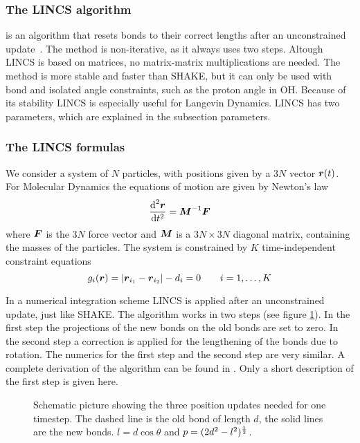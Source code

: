 \newcommand{\fs}{\begin{equation} \label}
\newcommand{\fe}{\end{equation}}
\newcommand{\p}{\partial}
\newcommand{\Bm}{\ve{B}}
\newcommand{\M}{\ve{M}}
\newcommand{\iM}{\M^{-1}}
\newcommand{\Tm}{\ve{T}}
\newcommand{\Sm}{\ve{S}}
\newcommand{\fo}{\ve{f}}
\newcommand{\con}{\ve{g}}
\newcommand{\lenc}{\ve{d}}

\subsubsection*{The LINCS algorithm}
 is an algorithm that resets bonds to their correct lengths
after an unconstrained update~\cite{Hess97}. 
The method is non-iterative, as it always uses two steps.
Altough LINCS is based on matrices, no matrix-matrix multiplications are 
needed. The method is more stable and faster than SHAKE, 
but it can only be used with bond  and 
isolated angle constraints, such as the proton angle in OH. 
Because of its stability LINCS is especially useful for Langevin Dynamics. 
LINCS has two parameters, which are explained in the subsection parameters.
 
\subsubsection*{The LINCS formulas}
We consider a system of $N$ particles, with positions given by a
$3N$ vector $\mbox{\boldmath ${r}$}(t)$.
For Molecular Dynamics the equations of motion are given by Newton's law
\fs{c1}
{\de^2 \ve{r} \over \de t^2} = \iM \ve{F}
\fe
where $\mbox{\boldmath ${F}$}$ is the $3N$ force vector 
and $\M$ is a $3N \times 3N$ diagonal matrix,
containing the masses of the particles.
The system is constrained by $K$ time-independent constraint equations
\fs{c2}
g_i(\ve{r}) = | \ve{r}_{i_1}-\ve{r}_{i_2} | - d_i = 0 ~~~~~~i=1,\ldots,K
\fe

In a numerical integration scheme LINCS is applied after an 
unconstrained update, just like SHAKE.
The algorithm works in two steps (see figure \ref{lincs_fig}).
In the first step the projections of the new bonds on the old
bonds are set to zero. In the second step a correction is 
applied for the lengthening of the bonds due to rotation.
The numerics for the first step and the second step are very similar. 
A complete derivation of the algorithm can be found in \cite{Hess97}.
Only a short description of the first step is given here.
\begin{figure}
\centerline{}
\caption{
\label{lincs_fig}Schematic picture showing the three position updates needed 
for one timestep. 
The dashed line is the old bond of length $d$, 
the solid lines are the new bonds.
$l=d \cos \theta$ 
and $p=(2 d^2 - l^2)^{1 \over 2}$.
}
\end{figure}

